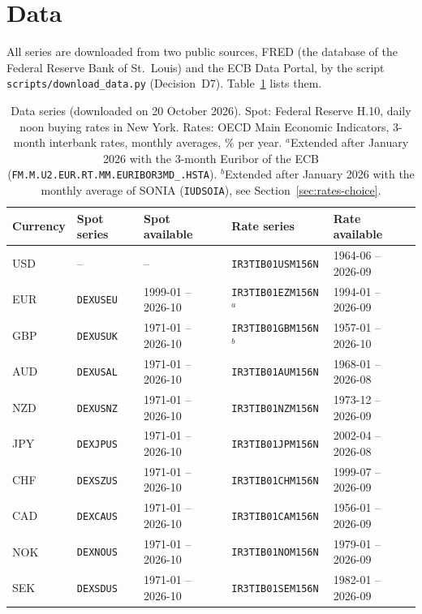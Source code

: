 \section{Data}\label{sec:data}

All series are downloaded from two public sources, FRED (the database of the Federal Reserve Bank of St.~Louis) and the ECB Data Portal, by the script \texttt{scripts/download\_data.py} (Decision~D7).
Table~\ref{tab:data} lists them.

\begin{table}[h]
\centering
\footnotesize
\begin{tabular}{@{}lllll@{}}
\toprule
Currency & Spot series & Spot available & Rate series & Rate available \\
\midrule
USD & -- & -- & \texttt{IR3TIB01USM156N} & 1964-06 -- 2026-09 \\
EUR & \texttt{DEXUSEU} & 1999-01 -- 2026-10 & \texttt{IR3TIB01EZM156N}$^a$ & 1994-01 -- 2026-09 \\
GBP & \texttt{DEXUSUK} & 1971-01 -- 2026-10 & \texttt{IR3TIB01GBM156N}$^b$ & 1957-01 -- 2026-10 \\
AUD & \texttt{DEXUSAL} & 1971-01 -- 2026-10 & \texttt{IR3TIB01AUM156N} & 1968-01 -- 2026-08 \\
NZD & \texttt{DEXUSNZ} & 1971-01 -- 2026-10 & \texttt{IR3TIB01NZM156N} & 1973-12 -- 2026-09 \\
JPY & \texttt{DEXJPUS} & 1971-01 -- 2026-10 & \texttt{IR3TIB01JPM156N} & 2002-04 -- 2026-08 \\
CHF & \texttt{DEXSZUS} & 1971-01 -- 2026-10 & \texttt{IR3TIB01CHM156N} & 1999-07 -- 2026-09 \\
CAD & \texttt{DEXCAUS} & 1971-01 -- 2026-10 & \texttt{IR3TIB01CAM156N} & 1956-01 -- 2026-09 \\
NOK & \texttt{DEXNOUS} & 1971-01 -- 2026-10 & \texttt{IR3TIB01NOM156N} & 1979-01 -- 2026-09 \\
SEK & \texttt{DEXSDUS} & 1971-01 -- 2026-10 & \texttt{IR3TIB01SEM156N} & 1982-01 -- 2026-09 \\
\bottomrule
\end{tabular}
\caption{Data series (downloaded on 20 October 2026). Spot: Federal Reserve H.10, daily noon buying rates in New York. Rates: OECD Main Economic Indicators, 3-month interbank rates, monthly averages, \% per year. $^a$Extended after January 2026 with the 3-month Euribor of the ECB (\texttt{FM.M.U2.EUR.RT.MM.EURIBOR3MD\_.HSTA}). $^b$Extended after January 2026 with the monthly average of SONIA (\texttt{IUDSOIA}), see Section~\ref{sec:rates-choice}.}
\label{tab:data}
\end{table}

